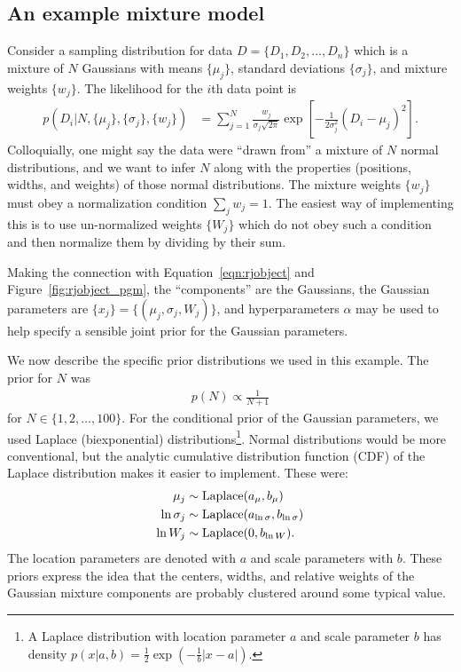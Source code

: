 \documentclass[article]{jss}
\begin{document}
\subsection{An example mixture model}
Consider a sampling distribution
for data $D=\{D_1, D_2, \ldots, D_n\}$ which is a mixture of $N$ Gaussians
with means $\{\mu_j\}$, standard deviations $\{\sigma_j\}$, and
mixture weights $\{w_j\}$. The likelihood for the $i$th data point is
\begin{align*}
p\left(D_i | N, \{\mu_j\}, \{\sigma_j\}, \{w_j\}\right) &=
\sum_{j=1}^N \frac{w_j}{\sigma_j\sqrt{2\pi}}
\exp\left[-\frac{1}{2\sigma_j^2}\left(D_i - \mu_j\right)^2\right].
\end{align*}
Colloquially, one might say the data were ``drawn from'' a mixture of
$N$ normal distributions, and we want to infer $N$ along with the
properties (positions, widths, and weights) of those normal distributions.
The mixture weights $\{w_j\}$ must obey a normalization condition
$\sum_j w_j = 1$. The easiest way of implementing this is to use
un-normalized weights $\{W_j\}$ which do not obey
such a condition and then normalize them by dividing by their sum.

Making the connection with Equation~\ref{eqn:rjobject} and
Figure~\ref{fig:rjobject_pgm}, the ``components'' are the Gaussians,
the Gaussian parameters are $\{x_j\} = \{(\mu_j, \sigma_j, W_j)\}$,
and hyperparameters $\alpha$ may be used to help specify
a sensible joint prior for the Gaussian parameters.

We now describe the specific prior distributions we used in this example.
The prior for $N$ was
\begin{align*}
p(N) \propto \frac{1}{N+1}
\end{align*}
for $N \in \{1, 2, \ldots, 100\}$.
For the conditional prior of the Gaussian parameters,
we used Laplace (biexponential)
distributions\footnote{A Laplace
distribution with location parameter $a$ and scale parameter
$b$ has density $p(x | a, b) = \frac{1}{2}\exp\left(-\frac{1}{b}|x - a|\right)$.}.
Normal distributions would be more conventional, but the analytic cumulative
distribution function (CDF) of the Laplace distribution makes it easier to
implement. These were:
\begin{align}
\mu_j &\sim \textnormal{Laplace}(a_\mu, b_\mu)\label{eqn:cond_prior1}\\
\ln\sigma_j &\sim \textnormal{Laplace}(a_{\ln\sigma}, b_{\ln\sigma})\label{eqn:cond_prior2}\\
\ln W_j &\sim \textnormal{Laplace}(0, b_{\ln W}).\label{eqn:cond_prior3}
\end{align}
The location parameters are denoted with $a$ and scale parameters with $b$.
These priors express the idea that the centers, widths, and relative weights
of the Gaussian mixture components are probably clustered around some typical
value.
\end{document}
